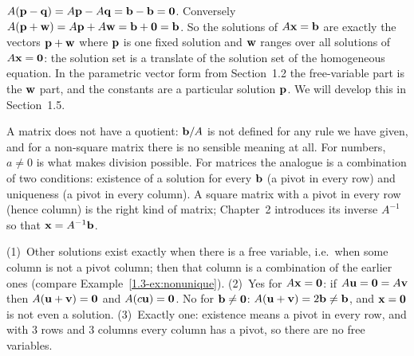 \documentclass[11pt]{article}
\begin{document}
\begin{description}[leftmargin=0pt,itemsep=5pt]
  \item[Pause and think \ref{think:pattern}.] $A(\mathbf{p}-\mathbf{q})=A\mathbf{p}-A\mathbf{q}=\mathbf{b}-\mathbf{b}=\mathbf{0}$. Conversely $A(\mathbf{p}+\mathbf{w})=A\mathbf{p}+A\mathbf{w}=\mathbf{b}+\mathbf{0}=\mathbf{b}$. So the solutions of $A\mathbf{x}=\mathbf{b}$ are exactly the vectors $\mathbf{p}+\mathbf{w}$ where $\mathbf{p}$ is one fixed solution and $\mathbf{w}$ ranges over all solutions of $A\mathbf{x}=\mathbf{0}$: the solution set is a translate of the solution set of the homogeneous equation. In the parametric vector form from Section~1.2 the free-variable part is the $\mathbf{w}$ part, and the constants are a particular solution $\mathbf{p}$. We will develop this in Section~1.5.
  \item[Pause and think \ref{think:divide}.] A matrix does not have a quotient: $\mathbf{b}/A$ is not defined for any rule we have given, and for a non-square matrix there is no sensible meaning at all. For numbers, $a\neq0$ is what makes division possible. For matrices the analogue is a combination of two conditions: existence of a solution for every $\mathbf{b}$ (a pivot in every row) and uniqueness (a pivot in every column). A square matrix with a pivot in every row (hence column) is the right kind of matrix; Chapter~2 introduces its inverse $A^{-1}$ so that $\mathbf{x}=A^{-1}\mathbf{b}$.
  \item[Before the next section.] (1)~Other solutions exist exactly when there is a free variable, i.e.\ when some column is not a pivot column; then that column is a combination of the earlier ones (compare Example~\ref{1.3-ex:nonunique}). (2)~Yes for $A\mathbf{x}=\mathbf{0}$: if $A\mathbf{u}=\mathbf{0}=A\mathbf{v}$ then $A(\mathbf{u}+\mathbf{v})=\mathbf{0}$ and $A(c\mathbf{u})=\mathbf{0}$. No for $\mathbf{b}\neq\mathbf{0}$: $A(\mathbf{u}+\mathbf{v})=2\mathbf{b}\neq\mathbf{b}$, and $\mathbf{x}=\mathbf{0}$ is not even a solution. (3)~Exactly one: existence means a pivot in every row, and with $3$ rows and $3$ columns every column has a pivot, so there are no free variables.
\end{description}
 
\end{document}
